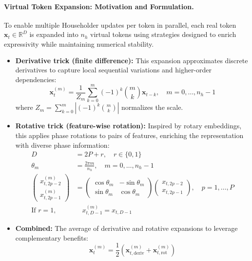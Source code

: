 \documentclass[10pt,a4paper]{article}
\begin{document}
\paragraph{Virtual Token Expansion: Motivation and Formulation.}

To enable multiple Householder updates per token in parallel, each real token $\mathbf{x}_t \in \mathbb{R}^D$ is expanded into $n_h$ virtual tokens using strategies designed to enrich expressivity while maintaining numerical stability.

\begin{itemize}
    \item \textbf{Derivative trick (finite difference):}  
    This expansion approximates discrete derivatives to capture local sequential variations and higher-order dependencies:
    \begin{equation}
        \mathbf{x}_t^{(m)} = \frac{1}{Z_m} \sum_{k=0}^m (-1)^k \binom{m}{k} \mathbf{x}_{t-k}, \quad m=0,\ldots,n_h-1
    \end{equation}
    where $Z_m = \sum_{k=0}^m \left|(-1)^k \binom{m}{k}\right|$ normalizes the scale.

    \item \textbf{Rotative trick (feature-wise rotation):}  
    Inspired by rotary embeddings, this applies phase rotations to pairs of features, enriching the representation with diverse phase information:
    \begin{align}
        D &= 2P + r, \quad r \in \{0,1\} \\
        \theta_m &= \frac{2\pi m}{n_h}, \quad m=0,\ldots,n_h-1 \\
        \begin{pmatrix}
            x_{t,2p-2}^{(m)} \\
            x_{t,2p-1}^{(m)}
        \end{pmatrix}
        &=
        \begin{pmatrix}
            \cos\theta_m & -\sin\theta_m \\
            \sin\theta_m & \cos\theta_m
        \end{pmatrix}
        \begin{pmatrix}
            x_{t,2p-2} \\
            x_{t,2p-1}
        \end{pmatrix}, \quad p=1,\ldots,P \\
        \text{If } r=1, &\quad x_{t,D-1}^{(m)} = x_{t,D-1}
    \end{align}

    \item \textbf{Combined:}  
    The average of derivative and rotative expansions to leverage complementary benefits:
    \begin{equation}
        \mathbf{x}_t^{(m)} = \frac{1}{2} \left( \mathbf{x}_{t,\mathrm{deriv}}^{(m)} + \mathbf{x}_{t,\mathrm{rot}}^{(m)} \right)
    \end{equation}
\end{itemize}
\end{document}
